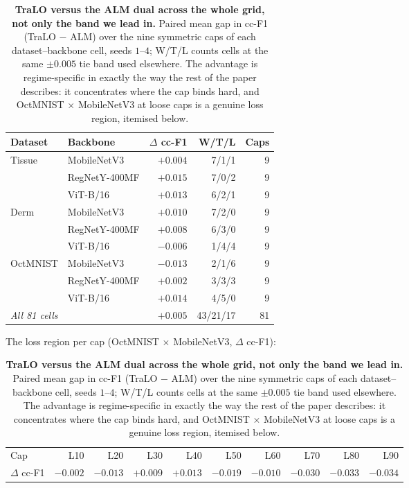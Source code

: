 \begin{table}[t]\centering\small
\caption{{\color{blue}\textbf{TraLO versus the ALM dual across the whole grid, not only the band we lead in.} Paired mean gap in cc-F1 (TraLO $-$ ALM) over the nine symmetric caps of each dataset--backbone cell, seeds $1$--$4$; W/T/L counts cells at the same $\pm0.005$ tie band used elsewhere. The advantage is regime-specific in exactly the way the rest of the paper describes: it concentrates where the cap binds hard, and OctMNIST $\times$ MobileNetV3 at loose caps is a genuine loss region, itemised below.}}
\label{tab:alm_regime}
\begin{tabular}{ll rr r}
\toprule
Dataset & Backbone & $\Delta$ cc-F1 & W/T/L & Caps \\
\midrule
Tissue & MobileNetV3 & $+0.004$ & 7/1/1 & 9 \\
 & RegNetY-400MF & $+0.015$ & 7/0/2 & 9 \\
 & ViT-B/16 & $+0.013$ & 6/2/1 & 9 \\
\midrule
Derm & MobileNetV3 & $+0.010$ & 7/2/0 & 9 \\
 & RegNetY-400MF & $+0.008$ & 6/3/0 & 9 \\
 & ViT-B/16 & $-0.006$ & 1/4/4 & 9 \\
\midrule
OctMNIST & MobileNetV3 & $-0.013$ & 2/1/6 & 9 \\
 & RegNetY-400MF & $+0.002$ & 3/3/3 & 9 \\
 & ViT-B/16 & $+0.014$ & 4/5/0 & 9 \\
\midrule
\multicolumn{2}{l}{\emph{All 81 cells}} & $+0.005$ & 43/21/17 & 81 \\
\bottomrule
\end{tabular}
\vspace{4pt}
{\color{blue}\footnotesize The loss region per cap (OctMNIST $\times$ MobileNetV3, $\Delta$ cc-F1):}
\vspace{2pt}
{\color{blue}\footnotesize\begin{tabular}{lrrrrrrrrr}
\toprule
Cap & L10 & L20 & L30 & L40 & L50 & L60 & L70 & L80 & L90 \\
$\Delta$ cc-F1 & $-0.002$ & $-0.013$ & $+0.009$ & $+0.013$ & $-0.019$ & $-0.010$ & $-0.030$ & $-0.033$ & $-0.034$ \\
\bottomrule
\end{tabular}}
\end{table}
